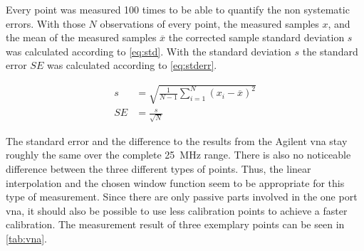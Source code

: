 \documentclass[12pt,a4paper,parskip=full,abstract=true,BCOR=12mm,twoside,open=right]{scrreprt}
\providecommand{\mean}[1]{\overline{#1}}
\begin{document}
Every point was measured 100 times to be able to quantify the non systematic errors. With those
$N$ observations of every point, the measured samples $x$, and the mean of the measured samples
$\mean{x}$ the corrected sample standard deviation $s$ was calculated according to \cref{eq:std}.
With the standard deviation $s$ the standard error $SE$ was calculated according to \cref{eq:stderr}.

\begin{align}
    \label{eq:std} s &= \sqrt{\frac{1}{N-1} \sum^N_{i=1} (x_i - \mean{x})^2} \\
    \label{eq:stderr} SE &= \frac{s}{\sqrt{N}}
\end{align}

The standard error and the difference to the results from the Agilent \gls{vna} stay roughly the
same over the complete \SI{25}{\mega\hertz} range. There is also no noticeable difference between
the three different types of points. Thus, the linear interpolation and the chosen window function
seem to be appropriate for this type of measurement. Since there are only passive parts involved
in the one port \gls{vna}, it should also be possible to use less calibration points to achieve a
faster calibration. The measurement result of three exemplary points can be seen in \cref{tab:vna}.
\end{document}
